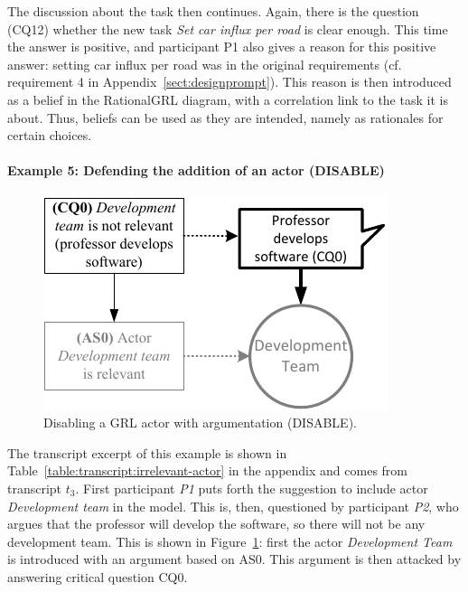 The discussion about the task then continues. Again, there is the question (CQ12) whether the new task \emph{Set car influx per road} is clear enough. This time the answer is positive, and participant P1 also gives a reason for this positive answer: setting car influx per road was in the original requirements (cf. requirement 4 in Appendix~\ref{sect:designprompt}). This reason is then introduced as a belief in the RationalGRL diagram, with a correlation link to the task it is about. Thus, beliefs can be used as they are intended, namely as rationales for certain choices.

\paragraph{Example 5: Defending the addition of an actor (\textsf{DISABLE)}}

\begin{figure}[t]
\centering
\includegraphics[]{img/reinstate1.pdf}
\caption{Disabling a GRL actor with argumentation (\textsf{DISABLE)}.}
\label{fig:examples:relevant-actor}
\end{figure}

The transcript excerpt of this example is shown in Table~\ref{table:transcript:irrelevant-actor} in the appendix and comes from transcript $t_3$. First participant \emph{P1} puts forth the suggestion to include actor \emph{Development team} in the model. This is, then, questioned by participant \emph{P2}, who argues that the professor will develop the software, so there will not be any development team. This is shown in Figure~\ref{fig:examples:relevant-actor}: first the actor \emph{Development Team} is introduced with an argument based on AS0. This argument is then attacked by answering critical question CQ0. 

